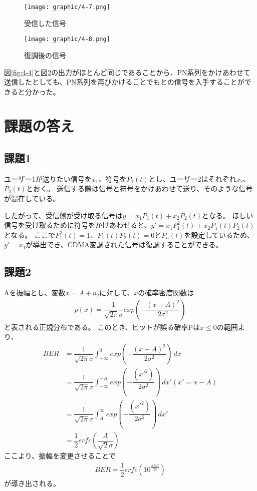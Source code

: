 \documentclass[dvipdfmx]{jsarticle}
\begin{document}
\begin{figure}[H]
  \begin{center}
    \texttt{[image: graphic/4-7.png]}
  \end{center}
  \caption{受信した信号}
  \label{fig:4-7}
\end{figure}

\begin{figure}[H]
  \begin{center}
    \texttt{[image: graphic/4-8.png]}
  \end{center}
  \caption{復調後の信号}
  \label{fig:4-8}
\end{figure}

図\ref*{fig:4-4}と図\ref*{fig:4-8}の出力がほとんど同じであることから、PN系列をかけあわせて送信したとしても、PN系列を再びかけることでもとの信号を入手することができると分かった。


\section{課題の答え}
\subsection{課題1}
ユーザー1が送りたい信号を$x_1$、符号を$P_1(t)$とし、ユーザー2はそれぞれ$x_2$、$P_2(t)$とおく。
送信する際は信号と符号をかけあわせて送り、そのような信号が混在している。

したがって、受信側が受け取る信号は$y = x_1 P_1(t) + x_2 P_2(t)$となる。
ほしい信号を受け取るために符号をかけあわせると、$y' = x_1 P_1^2(t) + x_2 P_1(t) P_2(t)$となる。
ここで$P_1^2(t) = 1$、$P_1(t) P_2(t) = 0$と$P_n(t)$を設定しているため、
$y' = x_1$が導出でき、CDMA変調された信号は復調することができる。

\subsection{課題2}
Aを振幅とし、変数$x = A + n_I$に対して、$x$の確率密度関数は
\begin{align}
  p(x) = \dfrac{1}{\sqrt{2\pi}\sigma}exp(-\dfrac{(x-A)^2}{2\sigma^2})
\end{align}
と表される正規分布である。
このとき、ビットが誤る確率Pは$x \leq 0$の範囲より、
\begin{align}
  BER &= \dfrac{1}{\sqrt{2\pi}\sigma} \int_{-\infty}^{0 } exp(-\dfrac{(x-A)^2}{2\sigma^2}) \,dx \\
  &= \dfrac{1}{\sqrt{2\pi}\sigma} \int_{-\infty}^{-A } exp(-\dfrac{(x'^2)}{2\sigma^2}) \,dx'     (x'=x-A)\\
  &= \dfrac{1}{\sqrt{2\pi}\sigma} \int_{A}^{\infty} exp(-\dfrac{(x'^2)}{2\sigma^2}) \,dx'\\
  &= \dfrac{1}{2} erfc(\dfrac{A}{\sqrt{2}\sigma})
\end{align}
ここより、振幅を変更させることで
\begin{align}
  BER = \dfrac{1}{2}erfc(10^\frac{SNR}{20})
\end{align}
が導き出される。
\end{document}
